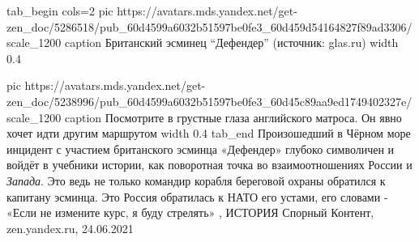 \ifcmt
tab_begin cols=2
  pic https://avatars.mds.yandex.net/get-zen_doc/5286518/pub_60d4599a6032b51597be0fe3_60d459d54164827f89ad3306/scale_1200
	caption Британский эсминец \enquote{Дефендер} (источник: glas.ru)
	width 0.4

	pic https://avatars.mds.yandex.net/get-zen_doc/5238996/pub_60d4599a6032b51597be0fe3_60d45c89aa9ed1749402327e/scale_1200
	caption Посмотрите в грустные глаза английского матроса. Он явно хочет идти другим маршрутом
	width 0.4
tab_end
\fi
Произошедший в Чёрном море инцидент с участием британского эсминца «Дефендер»
глубоко символичен и войдёт в учебники истории, как поворотная точка во
взаимоотношениях России и \emph{Запада}.  Это ведь не только командир корабля
береговой охраны обратился к капитану эсминца. Это Россия обратилась к НАТО его
устами, его словами - «Если не измените курс, я буду стрелять»
, 
ИСТОРИЯ Спорный Контент, zen.yandex.ru, 24.06.2021 

